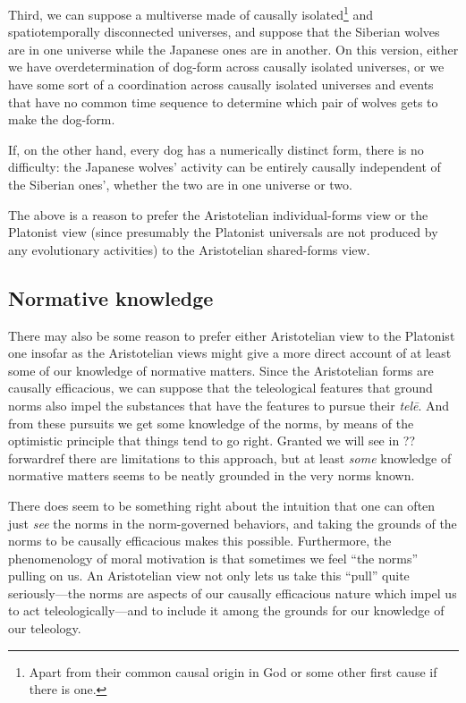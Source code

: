 Third, we can suppose a multiverse made of causally isolated\footnote{Apart from
their common causal origin in God or some other first cause if there is
one.} and spatiotemporally disconnected universes, and suppose that the Siberian
wolves are in one universe while the Japanese ones are in another. On this version,
either we have overdetermination of dog-form across causally isolated universes, or we 
have some sort of a coordination across causally isolated universes and events that
have no common time sequence to determine which pair of wolves gets to make the
dog-form. 

If, on the other hand, every dog has a numerically distinct form,
there is no difficulty: the Japanese wolves' activity can be entirely
causally independent of the Siberian ones', whether the two are in
one universe or two.

The above is a reason to prefer the Aristotelian individual-forms view or the
Platonist view (since presumably the Platonist universals are not produced by
any evolutionary activities) to the Aristotelian shared-forms view.

\subsection{Normative knowledge}
There may also be some reason to prefer either Aristotelian view to the Platonist one
insofar as the Aristotelian views might give a more direct account of at least some of 
our knowledge of normative matters. Since the Aristotelian forms are causally efficacious, we can
suppose that the teleological features that ground norms also impel the substances
that have the features to pursue their \textit{tel\=e}. And from these pursuits
we get some knowledge of the norms, by means of the optimistic principle that things
tend to go right. Granted we will see in ??forwardref there are limitations to this 
approach, but at least \textit{some} knowledge of normative matters seems to be neatly
grounded in the very norms known. 

There does seem to be something right about the intuition that one can often just \textit{see} the 
norms in the norm-governed behaviors, and taking the grounds of the norms to be causally efficacious makes
this possible. Furthermore, the phenomenology of moral motivation is that sometimes we feel ``the norms'' pulling
on us. An Aristotelian view not only lets us take this ``pull'' quite seriously---the norms are aspects of our
causally efficacious nature which impel us to act teleologically---and to include it among the grounds for our knowledge
of our teleology.

